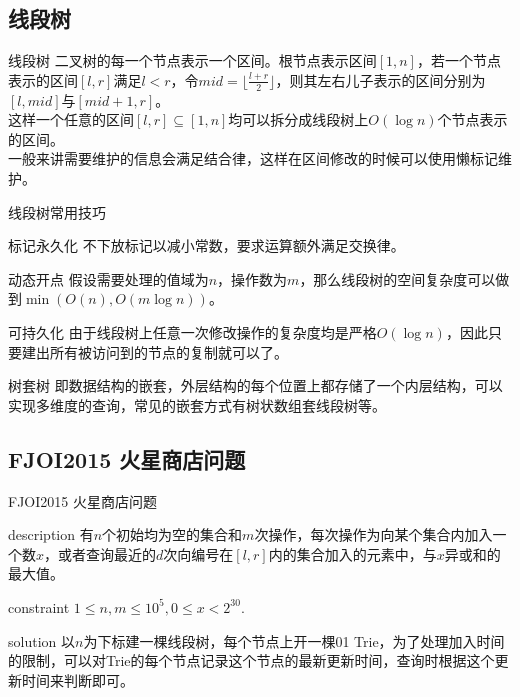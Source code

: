 \documentclass{beamer}
\begin{document}
\subsection{线段树}
\begin{frame}{线段树}
二叉树的每一个节点表示一个区间。根节点表示区间$[1,n]$，若一个节点表示的区间$[l,r]$满足$l<r$，令$mid=\lfloor\frac{l+r}{2}\rfloor$，则其左右儿子表示的区间分别为$[l,mid]$与$[mid+1,r]$。\\

这样一个任意的区间$[l,r]\subseteq[1,n]$均可以拆分成线段树上$O(\log n)$个节点表示的区间。\\

一般来讲需要维护的信息会满足结合律，这样在区间修改的时候可以使用懒标记维护。
\end{frame}
\begin{frame}{线段树常用技巧}
\begin{block}{标记永久化}
	不下放标记以减小常数，要求运算额外满足交换律。
\end{block}
\pause
\begin{block}{动态开点}
	假设需要处理的值域为$n$，操作数为$m$，那么线段树的空间复杂度可以做到$\min(O(n),O(m\log n))$。
\end{block}
\pause
\begin{block}{可持久化}
	由于线段树上任意一次修改操作的复杂度均是严格$O(\log n)$，因此只要建出所有被访问到的节点的复制就可以了。
\end{block}
\pause
\begin{block}{树套树}
	即数据结构的嵌套，外层结构的每个位置上都存储了一个内层结构，可以实现多维度的查询，常见的嵌套方式有树状数组套线段树等。
\end{block}
\end{frame}
\subsection{FJOI2015 火星商店问题}
\begin{frame}{FJOI2015 火星商店问题}
\begin{block}{description}
	有$n$个初始均为空的集合和$m$次操作，每次操作为向某个集合内加入一个数$x$，或者查询最近的$d$次向编号在$[l,r]$内的集合加入的元素中，与$x$异或和的最大值。
\end{block}
\begin{block}{constraint}
	$1 \le n, m \le 10^5, 0 \le x < 2^{30}.$
\end{block}
\pause
\begin{block}{solution}
	以$n$为下标建一棵线段树，每个节点上开一棵01 Trie，为了处理加入时间的限制，可以对Trie的每个节点记录这个节点的最新更新时间，查询时根据这个更新时间来判断即可。
\end{block}
\end{frame}
\end{document}
